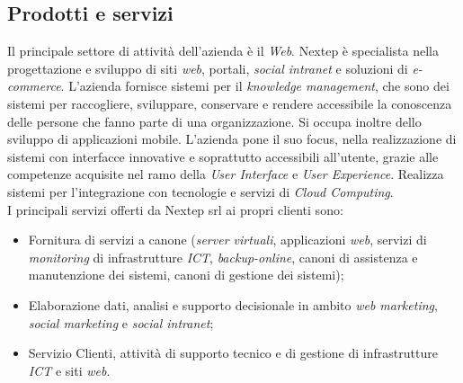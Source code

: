 \subsection{Prodotti e servizi}
Il principale settore di attività dell'azienda è il \emph{Web}. Nextep è specialista nella progettazione e sviluppo di siti \emph{web}, portali, \emph{social intranet} e soluzioni di \emph{e-commerce}. L'azienda fornisce sistemi per il \emph{knowledge management}, che sono dei sistemi per raccogliere, sviluppare, conservare e rendere accessibile la conoscenza delle persone che fanno parte di una organizzazione. Si occupa inoltre dello sviluppo di  applicazioni mobile. L'azienda pone il suo focus, nella realizzazione di sistemi con interfacce innovative e soprattutto accessibili all'utente, grazie alle competenze acquisite nel ramo della \emph{User Interface} e \emph{User Experience}. Realizza sistemi per l'integrazione con tecnologie e servizi di \emph{Cloud Computing}.\\
I principali servizi offerti da Nextep srl ai propri clienti sono:
\begin{itemize}
\item Fornitura di servizi a canone (\emph{server virtuali}, applicazioni \emph{web}, servizi di \emph{monitoring} di infrastrutture \emph{ICT}, \emph{backup-online}, canoni di assistenza e manutenzione dei sistemi, canoni di gestione dei sistemi);
\item Elaborazione dati, analisi e supporto decisionale in ambito \emph{web marketing}, \emph{social marketing} e \emph{social intranet};
\item Servizio Clienti, attività di supporto tecnico e di gestione di infrastrutture \emph{ICT} e siti \emph{web}.
\end{itemize}
